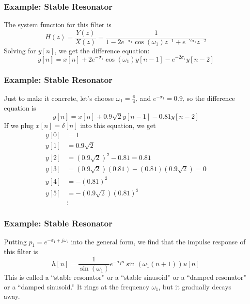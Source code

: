 \documentclass{beamer}
\begin{document}
\begin{frame}
  \frametitle{Example: Stable Resonator}

  The system function for this filter is
  \[
  H(z) = \frac{Y(z)}{X(z)} = \frac{1}{1-2e^{-\sigma_1}\cos(\omega_1) z^{-1} + e^{-2\sigma_1}z^{-2}}
  \]
  Solving for $y[n]$, we get the difference equation:
  \[
  y[n] = x[n] + 2e^{-\sigma_1}\cos(\omega_1) y[n-1] - e^{-2\sigma_1}y[n-2]
  \]
\end{frame}

\begin{frame}
  \frametitle{Example: Stable Resonator}

  Just to make it concrete, let's choose $\omega_1=\frac{\pi}{4}$, and
  $e^{-\sigma_1}=0.9$, so the difference equation is
  \[
  y[n] = x[n] + 0.9\sqrt{2} y[n-1] - 0.81 y[n-2]
  \]
  If we plug $x[n]=\delta[n]$ into this equation, we get
  \begin{align*}
    y[0] &= 1\\
    y[1] &= 0.9\sqrt{2}\\
    y[2] &= (0.9\sqrt{2})^2 - 0.81 = 0.81\\
    y[3] &= (0.9\sqrt{2})(0.81)-(0.81)(0.9\sqrt{2})=0\\
    y[4] &= -(0.81)^2\\
    y[5] &= -(0.9\sqrt{2})(0.81)^2\\
    &\vdots
  \end{align*}
\end{frame}

\begin{frame}
  \frametitle{Example: Stable Resonator}

  Putting $p_1=e^{-\sigma_1+j\omega_1}$ into the general form, we find that the
  impulse response of this filter is
  \[
  h[n] = \frac{1}{\sin(\omega_1)}e^{-\sigma_1 n}\sin(\omega_1 (n+1))u[n]
  \]
  This is called a ``stable resonator'' or a ``stable sinusoid'' or a
  ``damped resonator'' or a ``damped sinusoid.''  It rings at the
  frequency $\omega_1$, but it gradually decays away.
\end{frame}

\begin{frame}
  \centerline{}
\end{frame}
\end{document}
